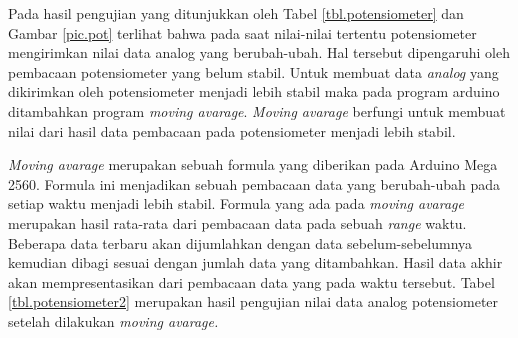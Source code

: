 Pada hasil pengujian yang ditunjukkan oleh Tabel \ref{tbl.potensiometer} dan Gambar \ref{pic.pot} terlihat bahwa pada saat nilai-nilai tertentu potensiometer  mengirimkan nilai data analog yang berubah-ubah. Hal tersebut dipengaruhi oleh pembacaan potensiometer yang belum stabil. Untuk membuat data \textit{analog} yang dikirimkan oleh potensiometer menjadi lebih stabil maka pada program arduino ditambahkan program \textit{moving avarage}. \textit{Moving avarage} berfungi untuk membuat nilai dari hasil data pembacaan pada potensiometer menjadi lebih stabil. 

\textit{Moving avarage} merupakan sebuah formula yang diberikan pada Arduino Mega 2560.  Formula ini menjadikan sebuah pembacaan data yang berubah-ubah pada setiap waktu menjadi lebih stabil. Formula yang ada pada \textit{moving avarage} merupakan hasil rata-rata dari pembacaan data pada sebuah \textit{range} waktu. Beberapa data terbaru akan dijumlahkan dengan data sebelum-sebelumnya kemudian dibagi sesuai dengan jumlah data yang ditambahkan. Hasil data akhir akan mempresentasikan dari pembacaan data yang pada waktu tersebut. Tabel \ref{tbl.potensiometer2} merupakan hasil pengujian nilai data analog potensiometer setelah dilakukan \textit{moving avarage.}

